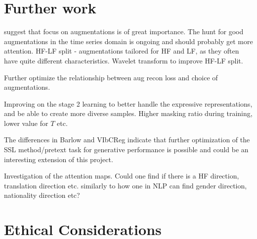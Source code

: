 \documentclass[../../thesis.tex]{subfiles}
\begin{document}
\section{Further work}



\cite{morningstar2024augmentations} suggest that focus on augmentations is of great importance. The hunt for good augmentations in the time series domain is ongoing and should probably get more attention.\newline
HF-LF split - augmentations tailored for HF and LF, as they often have quite different characteristics.\newline
Wavelet transform to improve HF-LF split.\newline

Further optimize the relationship between aug recon loss and choice of augmentations.\newline

Improving on the stage 2 learning to better handle the expressive representations, and be able to create more diverse samples. Higher masking ratio during training, lower value for $T$ etc.\newline

The differences in Barlow and VIbCReg indicate that further optimization of the SSL method/pretext task for generative performance is possible and could be an interesting extension of this project. \newline

Investigation of the attention maps. Could one find if there is a HF direction, translation direction etc. similarly to how one in NLP can find gender direction, nationality direction etc?


\section{Ethical Considerations}
\end{document}
